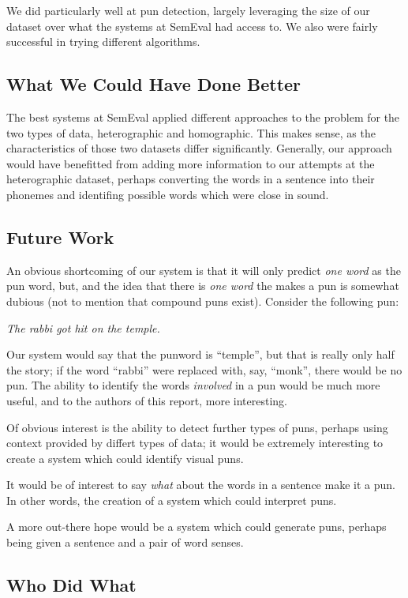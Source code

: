 \documentclass{article}
\begin{document}
We did particularly well at pun detection, largely leveraging the size of our
dataset over what the systems at SemEval had access to. We also were fairly
successful in trying different algorithms. 

\subsection{What We Could Have Done Better}

The best systems at SemEval applied different approaches to the problem for the
two types of data, heterographic and homographic. This makes sense, as the
characteristics of those two datasets differ significantly. Generally, our
approach would have benefitted from adding more information to our attempts at
the heterographic dataset, perhaps converting the words in a sentence into their
phonemes and identifing possible words which were close in sound.

\subsection{Future Work}

An obvious shortcoming of our system is that it will only predict \emph{one
word} as the pun word, but, and the idea that there is \emph{one word} the makes
a pun is somewhat dubious (not to mention that compound puns exist). Consider
the following pun: 
\begin{center}
	\emph{The rabbi got hit on the temple.}
\end{center}
Our system would say that the punword is ``temple'', but that is really only half
the story; if the word ``rabbi'' were replaced with, say, ``monk'', there would
be no pun. The ability to identify the words \emph{involved} in a pun would be
much more useful, and to the authors of this report, more interesting.

Of obvious interest is the ability to detect further types of puns, perhaps
using context provided by differt types of data; it would be extremely
interesting to create a system which could identify visual puns. 

It would be of interest to say \emph{what} about the words in a sentence make it
a pun. In other words, the creation of a system which could interpret puns.

A more out-there hope would be a system which could generate puns, perhaps being
given a sentence and a pair of word senses.

\subsection{Who Did What}
\end{document}
